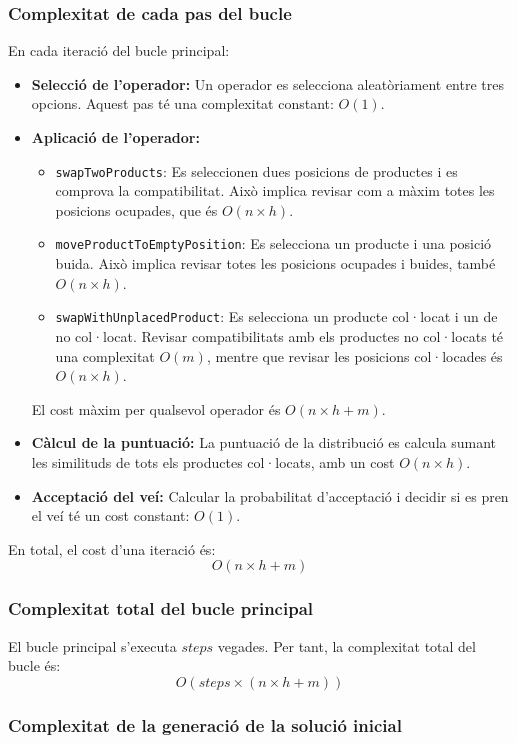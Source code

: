 \documentclass[a4paper,12pt]{report}
\begin{document}
\begin{itemize}
\subsubsection{Complexitat de cada pas del bucle}

En cada iteració del bucle principal:
\begin{itemize}
    \item \textbf{Selecció de l'operador:} Un operador es selecciona aleatòriament entre tres opcions. Aquest pas té una complexitat constant: \(O(1)\).
    \item \textbf{Aplicació de l'operador:} 
    \begin{itemize}
        \item \texttt{swapTwoProducts}: Es seleccionen dues posicions de productes i es comprova la compatibilitat. Això implica revisar com a màxim totes les posicions ocupades, que és \(O(n \times h)\).
        \item \texttt{moveProductToEmptyPosition}: Es selecciona un producte i una posició buida. Això implica revisar totes les posicions ocupades i buides, també \(O(n \times h)\).
        \item \texttt{swapWithUnplacedProduct}: Es selecciona un producte col·locat i un de no col·locat. Revisar compatibilitats amb els productes no col·locats té una complexitat \(O(m)\), mentre que revisar les posicions col·locades és \(O(n \times h)\).
    \end{itemize}
    El cost màxim per qualsevol operador és \(O(n \times h + m)\).
    \item \textbf{Càlcul de la puntuació:} La puntuació de la distribució es calcula sumant les similituds de tots els productes col·locats, amb un cost \(O(n \times h)\).
    \item \textbf{Acceptació del veí:} Calcular la probabilitat d'acceptació i decidir si es pren el veí té un cost constant: \(O(1)\).
\end{itemize}

En total, el cost d'una iteració és:
\[
O(n \times h + m)
\]

\subsubsection{Complexitat total del bucle principal}

El bucle principal s'executa \(steps\) vegades. Per tant, la complexitat total del bucle és:
\[
O(steps \times (n \times h + m))
\]

\subsubsection{Complexitat de la generació de la solució inicial}


\end{itemize}
\end{document}

